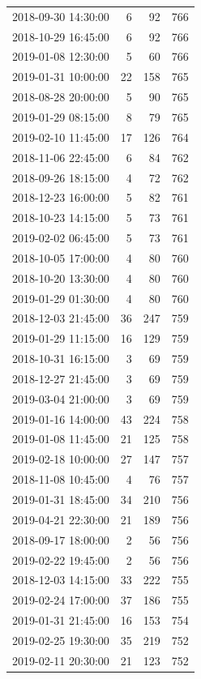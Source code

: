 \begin{tabular}{lrrr}
2018-09-30 14:30:00 & 6 & 92 & 766 \\
2018-10-29 16:45:00 & 6 & 92 & 766 \\
2019-01-08 12:30:00 & 5 & 60 & 766 \\
2019-01-31 10:00:00 & 22 & 158 & 765 \\
2018-08-28 20:00:00 & 5 & 90 & 765 \\
2019-01-29 08:15:00 & 8 & 79 & 765 \\
2019-02-10 11:45:00 & 17 & 126 & 764 \\
2018-11-06 22:45:00 & 6 & 84 & 762 \\
2018-09-26 18:15:00 & 4 & 72 & 762 \\
2018-12-23 16:00:00 & 5 & 82 & 761 \\
2018-10-23 14:15:00 & 5 & 73 & 761 \\
2019-02-02 06:45:00 & 5 & 73 & 761 \\
2018-10-05 17:00:00 & 4 & 80 & 760 \\
2018-10-20 13:30:00 & 4 & 80 & 760 \\
2019-01-29 01:30:00 & 4 & 80 & 760 \\
2018-12-03 21:45:00 & 36 & 247 & 759 \\
2019-01-29 11:15:00 & 16 & 129 & 759 \\
2018-10-31 16:15:00 & 3 & 69 & 759 \\
2018-12-27 21:45:00 & 3 & 69 & 759 \\
2019-03-04 21:00:00 & 3 & 69 & 759 \\
2019-01-16 14:00:00 & 43 & 224 & 758 \\
2019-01-08 11:45:00 & 21 & 125 & 758 \\
2019-02-18 10:00:00 & 27 & 147 & 757 \\
2018-11-08 10:45:00 & 4 & 76 & 757 \\
2019-01-31 18:45:00 & 34 & 210 & 756 \\
2019-04-21 22:30:00 & 21 & 189 & 756 \\
2018-09-17 18:00:00 & 2 & 56 & 756 \\
2019-02-22 19:45:00 & 2 & 56 & 756 \\
2018-12-03 14:15:00 & 33 & 222 & 755 \\
2019-02-24 17:00:00 & 37 & 186 & 755 \\
2019-01-31 21:45:00 & 16 & 153 & 754 \\
2019-02-25 19:30:00 & 35 & 219 & 752 \\
2019-02-11 20:30:00 & 21 & 123 & 752 \\

\end{tabular}
